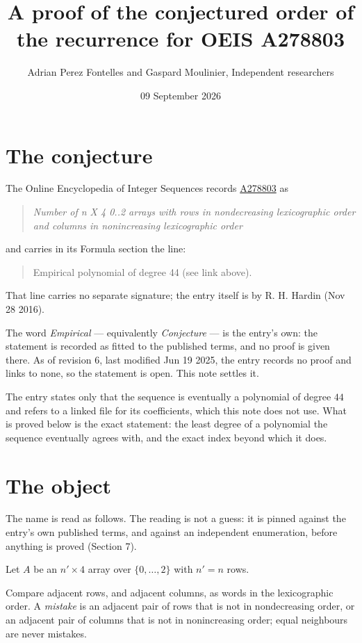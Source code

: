 \documentclass[11pt]{article}
\title{A proof of the conjectured order of the recurrence for OEIS A278803}
\author{Adrian Perez Fontelles and Gaspard Moulinier, Independent researchers}
\date{09 September 2026}
\theoremstyle{definition}
\begin{document}
\maketitle
\section{The conjecture}

The Online Encyclopedia of Integer Sequences records \href{https://oeis.org/A278803}{A278803} as

\begin{quote}\itshape Number of n X 4 0..2 arrays with rows in nondecreasing lexicographic order and columns in nonincreasing lexicographic order\end{quote}

and carries in its Formula section the line:

\begin{quote}\ttfamily Empirical polynomial of degree 44 (see link above).\end{quote}

That line carries no separate signature; the entry itself is by R. H. Hardin (Nov 28 2016).

The word {\itshape Empirical} --- equivalently {\itshape Conjecture} --- is the entry's own: the statement is recorded as fitted to the published terms, and no proof is given there. As of revision 6, last modified Jun 19 2025, the entry records no proof and links to none, so the statement is open. This note settles it.

The entry states only that the sequence is eventually a polynomial of degree $44$ and refers to a linked file for its coefficients, which this note does not use. What is proved below is the exact statement: the least degree of a polynomial the sequence eventually agrees with, and the exact index beyond which it does.

\section{The object}

The name is read as follows. The reading is not a guess: it is pinned against the entry's own published terms, and against an independent enumeration, before anything is proved (Section 7).

Let $A$ be an $n' \times 4$ array over $\{0,\dots,2\}$ with $n' = n$ rows.

Compare adjacent rows, and adjacent columns, as words in the lexicographic order. A {\itshape mistake} is an adjacent pair of rows that is not in nondecreasing order, or an adjacent pair of columns that is not in nonincreasing order; equal neighbours are never mistakes.
\end{document}
